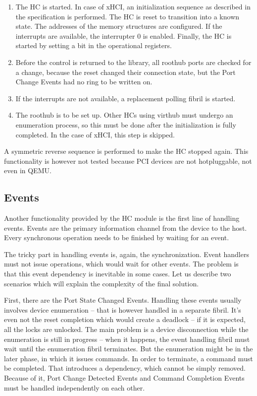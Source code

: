 \begin{enumerate}
\item
	The HC is started. In case of xHCI, an initialization sequence as described
	in the specification is performed. The HC is reset to transition into
	a known state. The addresses of the memory structures are configured. If
	the interrupts are available, the interrupter 0 is enabled. Finally, the HC
	is started by setting a bit in the operational registers.

\item
	Before the control is returned to the library, all roothub ports are
	checked for a change, because the reset changed their connection state,
	but the Port Change Events had no ring to be written on.

\item
	If the interrupts are not available, a replacement polling fibril is
	started.

\item
	The roothub is to be set up. Other HCs using virthub must undergo an
	enumeration process, so this must be done after the initialization is fully
	completed. In the case of xHCI, this step is skipped.
\end{enumerate}

A symmetric reverse sequence is performed to make the HC stopped again. This
functionality is however not tested because PCI devices are not hotpluggable,
not even in QEMU.

\subsection{Events}
\label{sec:events}

Another functionality provided by the HC module is the first line of handling
events. Events are the primary information channel from the device to the host.
Every synchronous operation needs to be finished by waiting for an event.

The tricky part in handling events is, again, the synchronization. Event
handlers must not issue operations, which would wait for other events. The
problem is that this event dependency is inevitable in some cases. Let us
describe two scenarios which will explain the complexity of the final solution.

First, there are the Port State Changed Events. Handling these events usually
involves device enumeration -- that is however handled in a separate fibril.
It's even not the reset completion which would create a deadlock -- if it is
expected, all the locks are unlocked. The main problem is a device
disconnection while the enumeration is still in progress -- when it happens,
the event handling fibril must wait until the enumeration fibril terminates.
But the enumeration might be in the later phase, in which it issues commands.
In order to terminate, a command must be completed. That introduces
a dependency, which cannot be simply removed. Because of it, Port Change
Detected Events and Command Completion Events must be handled independently on
each other.


